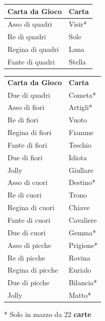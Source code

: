 \begin{multicols}{2}
\noindent\begin{tabularx}{0.48\textwidth}{ll}
\textbf{Carta da Gioco} & \textbf{Carta}\\
\hline
	Asso di quadri & Visir* \\
	Re di quadri & Sole \\
	Regina di quadri & Luna \\
	Fante di quadri & Stella \\
\end{tabularx}
\noindent\begin{tabularx}{0.48\textwidth}{ll}
	\textbf{Carta da Gioco} & \textbf{Carta}\\
	Due di quadri & Cometa* \\
	Asso di fiori & Artigli* \\
	Re di fiori & Vuoto \\
	Regina di fiori & Fiamme \\
	Fante di fiori & Teschio \\
	Due di fiori & Idiota \\
	Jolly & Giullare \\
	Asso di cuori & Destino* \\
	Re di cuori & Trono \\
	Regina di cuori & Chiave \\
	Fante di cuori & Cavaliere \\
	Due di cuori & Gemma* \\
	Asso di picche & Prigione* \\
	Re di picche & Rovina \\
	Regina di picche & Eurialo \\
	Due di picche & Bilancia* \\
	Jolly & Matto* \\
	\end{tabularx}

\medskip

* Solo in mazzo da 22 \textbf{carte}


\end{multicols}

